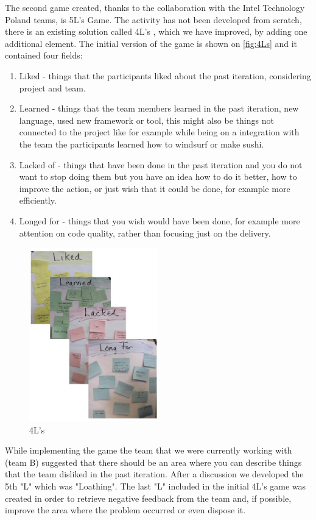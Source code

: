The second game created, thanks to the collaboration with the Intel Technology Poland teams, is 5L's Game. The activity has not been developed from scratch, there is an existing solution called 4L's \cite{4Ls}, which we have improved, by adding one additional element. The initial version of the game is shown on \autoref{fig:4Ls} and it contained four fields:
\begin{enumerate}
    \item Liked - things that the participants liked about the past iteration, considering project and team.
    \item Learned - things that the team members learned in the past iteration, new language, used new framework or tool, this might also be things not connected to the project like for example while being on a integration with the team the participants learned how to windsurf or make sushi.
    \item Lacked of - things that have been done in the past iteration and you do not want to stop doing them but you have an idea how to do it better, how to improve the action, or just wish that it could be done, for example more efficiently.
    \item Longed for - things that you wish would have been done, for example more attention on code quality, rather than focusing just on the delivery.
\end{enumerate}

\begin{figure}[h]
\caption{4L's} 
\label{fig:4Ls}
\centering
\includegraphics[width=0.5\textwidth]{img/4L}
\end{figure}

While implementing the game the team that we were currently working with (team B) suggested that there should be an area where you can describe things that the team disliked in the past iteration. After a discussion we developed the 5th "L" which was "Loathing". The last "L" included in the initial 4L's game was created in order to retrieve negative feedback from the team and, if possible, improve the area where the problem occurred or even dispose it.

